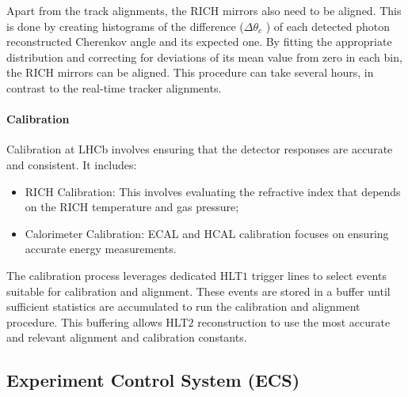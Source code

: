 Apart from the track alignments, the RICH mirrors also need to be aligned. This is done by creating histograms of the difference ($\Delta \theta_c$ ) of each detected photon reconstructed Cherenkov angle and its expected one. By fitting the appropriate distribution and correcting for deviations of its mean value from zero in each bin, the RICH mirrors can be aligned. This procedure can take several hours, in contrast to the real-time tracker alignments.
\paragraph{Calibration}
Calibration at LHCb involves ensuring that the detector responses are accurate and consistent. It includes:
\begin{itemize}
\item RICH Calibration: This involves evaluating the refractive index that depends on the RICH temperature and gas pressure;
\item Calorimeter Calibration: ECAL and HCAL calibration focuses on ensuring accurate energy measurements.
\end{itemize}
The calibration process leverages dedicated HLT$1$ trigger lines to select events suitable for calibration and alignment. These events are stored in a buffer until sufficient statistics are accumulated to run the calibration and alignment procedure. This buffering allows HLT$2$ reconstruction to use the most accurate and relevant alignment and calibration constants.


\subsection{Experiment Control System (ECS)}\label{sec:ecs}

